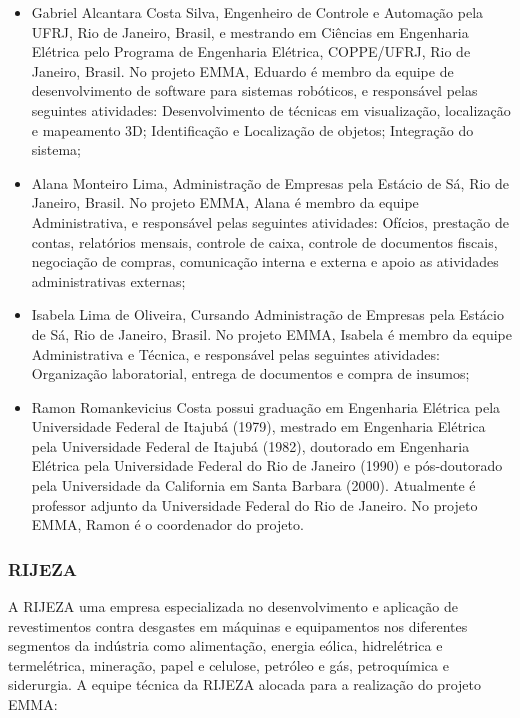 \begin{itemize}
\item Gabriel Alcantara Costa Silva, Engenheiro de Controle e Automação pela
UFRJ, Rio de Janeiro, Brasil, e mestrando em Ciências em Engenharia Elétrica pelo
Programa de Engenharia Elétrica, COPPE/UFRJ, Rio de Janeiro, Brasil. No projeto
EMMA, Eduardo é membro da equipe de desenvolvimento de software para sistemas
robóticos, e responsável pelas seguintes atividades: Desenvolvimento de técnicas
em visualização, localização e mapeamento 3D; Identificação e
Localização de objetos; Integração do sistema;

\item Alana Monteiro Lima, Administração de Empresas pela Estácio de Sá, Rio de
Janeiro, Brasil. No projeto EMMA, Alana é membro da equipe Administrativa, e 
responsável pelas seguintes atividades: Ofícios, prestação de contas, 
relatórios mensais, controle de caixa, controle de documentos fiscais, 
negociação de compras, comunicação interna e externa e apoio as atividades 
administrativas externas;

\item Isabela Lima de Oliveira, Cursando Administração de Empresas pela Estácio
de Sá, Rio de Janeiro, Brasil. No projeto EMMA, Isabela é membro da 
equipe Administrativa e Técnica, e responsável pelas seguintes atividades: 
Organização laboratorial, entrega de documentos e compra de insumos;

\item Ramon Romankevicius Costa possui graduação em Engenharia Elétrica pela
Universidade Federal de Itajubá (1979), mestrado em Engenharia Elétrica pela 
Universidade Federal de Itajubá (1982), doutorado em Engenharia Elétrica pela
Universidade Federal do Rio de Janeiro (1990) e pós-doutorado pela Universidade 
da California em Santa
Barbara (2000). Atualmente é professor adjunto da Universidade Federal do Rio de
Janeiro. No projeto EMMA, Ramon é o coordenador do projeto.

\end{itemize}


\subsubsection{RIJEZA} 

A RIJEZA uma empresa especializada no desenvolvimento e
aplicação de revestimentos contra desgastes em máquinas e equipamentos nos diferentes
segmentos da indústria como alimentação, energia eólica, hidrelétrica e
termelétrica, mineração, papel e celulose, petróleo e gás, petroquímica e siderurgia.
A equipe técnica da RIJEZA alocada para a realização do projeto EMMA:

